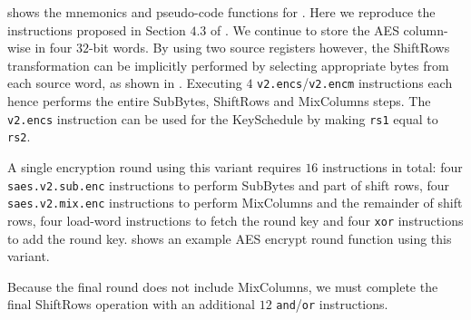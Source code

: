 
 shows the mnemonics and pseudo-code functions
for .
Here we reproduce the instructions proposed in Section $4.3$ of
\cite{TilGro:06}.
We continue to store the AES column-wise in four $32$-bit words.
By using two source registers however,
the ShiftRows transformation can be implicitly performed by selecting
appropriate bytes from each source word, as shown in
.
Executing $4$  {\tt v2.encs}/{\tt v2.encm} instructions each hence
performs the entire SubBytes, ShiftRows and MixColumns steps.
The {\tt v2.encs} instruction can be used for the KeySchedule by
making {\tt rs1} equal to {\tt rs2}.

A single encryption round using this variant requires $16$ instructions
in total:
four {\tt saes.v2.sub.enc} instructions to perform SubBytes and part of
shift rows,
four {\tt saes.v2.mix.enc} instructions to perform MixColumns and the
remainder of shift rows,
four load-word instructions to fetch the round key
and
four {\tt xor} instructions to add the round key.
 shows an example AES encrypt round function
using this variant.

Because the final round does not include MixColumns, we must
complete the final ShiftRows operation with an additional
$12$ {\tt and}/{\tt or} instructions.

